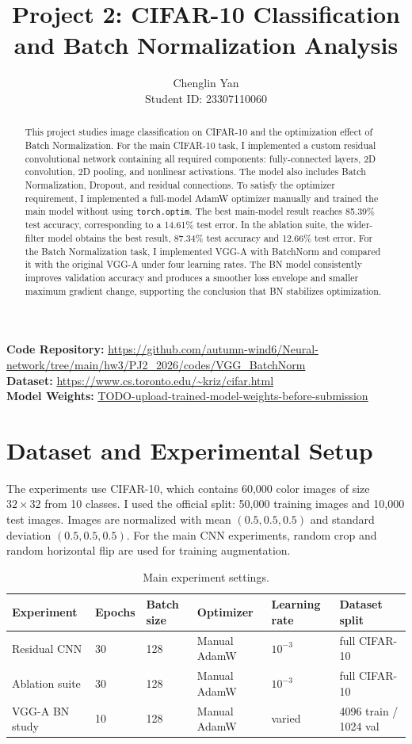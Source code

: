 \documentclass[12pt]{article}
\title{Project 2: CIFAR-10 Classification and Batch Normalization Analysis}
\author{Chenglin Yan\\Student ID: 23307110060}
\date{}
\begin{document}
\maketitle

\noindent\textbf{Code Repository:} \url{https://github.com/autumn-wind6/Neural-network/tree/main/hw3/PJ2_2026/codes/VGG_BatchNorm}\\
\textbf{Dataset:} \url{https://www.cs.toronto.edu/~kriz/cifar.html}\\
\textbf{Model Weights:} \url{TODO-upload-trained-model-weights-before-submission}

\begin{abstract}
This project studies image classification on CIFAR-10 and the optimization effect of Batch Normalization. For the main CIFAR-10 task, I implemented a custom residual convolutional network containing all required components: fully-connected layers, 2D convolution, 2D pooling, and nonlinear activations. The model also includes Batch Normalization, Dropout, and residual connections. To satisfy the optimizer requirement, I implemented a full-model AdamW optimizer manually and trained the main model without using \texttt{torch.optim}. The best main-model result reaches 85.39\% test accuracy, corresponding to a 14.61\% test error. In the ablation suite, the wider-filter model obtains the best result, 87.34\% test accuracy and 12.66\% test error. For the Batch Normalization task, I implemented VGG-A with BatchNorm and compared it with the original VGG-A under four learning rates. The BN model consistently improves validation accuracy and produces a smoother loss envelope and smaller maximum gradient change, supporting the conclusion that BN stabilizes optimization.
\end{abstract}

\section{Dataset and Experimental Setup}

The experiments use CIFAR-10, which contains 60,000 color images of size $32\times32$ from 10 classes. I used the official split: 50,000 training images and 10,000 test images. Images are normalized with mean $(0.5,0.5,0.5)$ and standard deviation $(0.5,0.5,0.5)$. For the main CNN experiments, random crop and random horizontal flip are used for training augmentation.

\begin{table}[H]
\centering
\caption{Main experiment settings.}
\begin{tabular}{llllll}
\toprule
Experiment & Epochs & Batch size & Optimizer & Learning rate & Dataset split \\
\midrule
Residual CNN & 30 & 128 & Manual AdamW & $10^{-3}$ & full CIFAR-10 \\
Ablation suite & 30 & 128 & Manual AdamW & $10^{-3}$ & full CIFAR-10 \\
VGG-A BN study & 10 & 128 & Manual AdamW & varied & 4096 train / 1024 val \\
\bottomrule
\end{tabular}
\end{table}
\end{document}
